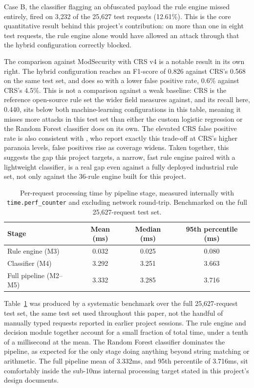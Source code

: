 \documentclass[runningheads]{llncs}
\begin{document}
Case B, the classifier flagging an obfuscated payload the rule engine
missed entirely, fired on 3{,}232 of the 25{,}627 test requests
(12.61\%). This is the core quantitative result behind this project's
contribution: on more than one in eight test requests, the rule engine
alone would have allowed an attack through that the hybrid
configuration correctly blocked.

The comparison against ModSecurity with CRS v4 is a notable result in
its own right. The hybrid configuration reaches an F1-score of 0.826
against CRS's 0.568 on the same test set, and does so with a lower
false positive rate, 0.6\% against CRS's 4.5\%. This is not a comparison
against a weak baseline: CRS is the reference open-source rule set the
wider field measures against, and its recall here, 0.440, sits below
both machine-learning configurations in this table, meaning it misses
more attacks in this test set than either the custom logistic
regression or the Random Forest classifier does on its own. The
elevated CRS false positive rate is also consistent with
\citet{reyesnarvaez2025}, who report exactly this trade-off at CRS's
higher paranoia levels, false positives rise as coverage widens. Taken
together, this suggests the gap this project targets, a narrow, fast
rule engine paired with a lightweight classifier, is a real gap even
against a fully deployed industrial rule set, not only against the
36-rule engine built for this project.

\begin{table}[t]
\centering
\caption{Per-request processing time by pipeline stage, measured
internally with \texttt{time.perf\_counter} and excluding network
round-trip. Benchmarked on the full 25{,}627-request test set.}
\label{tab:latency}
\begin{tabular}{lccc}
\toprule
Stage & Mean (ms) & Median (ms) & 95th percentile (ms) \\
\midrule
Rule engine (M3)      & 0.032 & 0.025 & 0.080 \\
Classifier (M4)       & 3.292 & 3.251 & 3.663 \\
Full pipeline (M2--M5)& 3.332 & 3.285 & 3.716 \\
\bottomrule
\end{tabular}
\end{table}

Table~\ref{tab:latency} was produced by a systematic benchmark over the
full 25{,}627-request test set, the same test set used throughout this
paper, not the handful of manually typed requests reported in earlier
project sessions. The rule engine and decision module together account
for a small fraction of total time, under a tenth of a millisecond at
the mean. The Random Forest classifier dominates the pipeline, as
expected for the only stage doing anything beyond string matching or
arithmetic. The full pipeline mean of 3.332ms, and 95th percentile of
3.716ms, sit comfortably inside the sub-10ms internal processing target
stated in this project's design documents.
\end{document}
